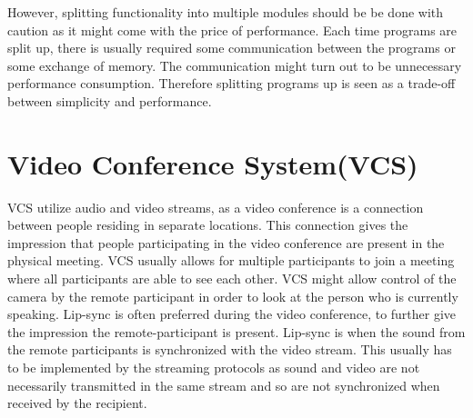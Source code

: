 However, splitting functionality into multiple modules should be be done with caution as it might come with the price of performance. Each time programs are split up, there is usually required some communication between the programs or some exchange of memory. The communication might turn out to be unnecessary performance consumption. Therefore splitting programs up is seen as a trade-off between simplicity and performance.











\section{Video Conference System(VCS)} \label{sec:design:vcs}
\ac{VCS} utilize audio and video streams, as a video conference is a connection between people residing in separate locations. This connection gives the impression that people participating in the video conference are present in the physical meeting. VCS usually allows for multiple participants to join a meeting where all participants are able to see each other. VCS might allow control of the camera by the remote participant in order to look at the person who is currently speaking. 
Lip-sync is often preferred during the video conference, to further give the impression the remote-participant is present. Lip-sync is when the sound from the remote participants is synchronized with the video stream. This usually has to be implemented by the streaming protocols as sound and video are not necessarily transmitted in the same stream and so are not synchronized when received by the recipient.

